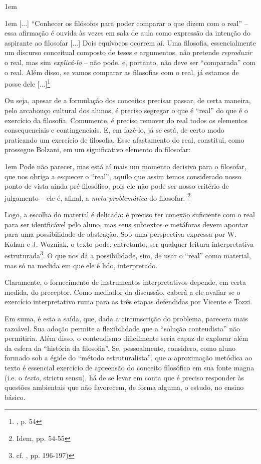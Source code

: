 \documentclass[12pt,a4paper]{article}
\newenvironment{citac}{
	\begin{addmargin}[4cm]{1em} \footnotesize}{\normalfont \end{addmargin}
}
\begin{document}
\begin{citac}
	\begin{citac}
		[...] “Conhecer os filósofos para poder comparar o que 
		dizem com o real” -- essa afirmação é ouvida às vezes 
		em sala de aula como expressão da intenção do aspirante 
		ao filosofar [...] Dois equívocos ocorrem aí. Uma 
		filosofia, essencialmente um discurso conceitual composto 
		de teses e argumentos, não pretende \emph{reproduzir} o 
		real, mas sim \emph{explicá-lo} -- não pode, e, portanto, 
		não deve ser “comparada” com o real. Além disso, se vamos 
		comparar as filosofias com o real, já estamos de posse dele
		[...]\footnote{\cite{bolzani}, p. 54}
	\end{citac}

	Ou seja, apesar de a formulação dos conceitos precisar passar, 
	de certa maneira, pelo arcabouço cultural dos alunos, é preciso 
	segregar o que é “real” do que é o exercício da filosofia. 
	Comumente, é preciso remover do real todos os elementos 
	consequenciais e contingenciais. E, em fazê-lo, já se está, de 
	certo modo praticando um exercício de filosofia. Esse afastamento 
	do real, constitui, como prossegue Bolzani, em um significativo 
	elemento do filosofar: 
	
	\begin{citac}
		Pode não parecer, mas está aí mais um momento decisivo para o 
		filosofar, que nos obriga a esquecer o “real”, aquilo que 
		assim temos considerado nosso ponto de vista ainda 
		pré-filosófico, pois ele não pode ser nosso critério de 
		julgamento -- ele é, afinal, a \emph{meta problemática} do 
		filosofar. \footnote{Idem, pp. 54-55}
	\end{citac}

	Logo, a escolha do material é delicada: é preciso ter conexão 
	suficiente com o real para ser identficável pelo aluno, mas seus 
	subtextos e metáforas devem apontar para uma possibilidade de 
	abstração. Sob uma perspectiva expressa por W. Kohan e J. Wozniak, 
	o texto pode, entretanto, ser qualquer leitura interpretativa 
	estruturada\footnote{cf. \cite{wozkoh}, pp. 196-197)}. O que 
	nos dá a possibilidade, sim, de usar o “real” como material, mas 
	só na medida em que ele é lido, interpretado. 

	Claramente, o fornecimento de instrumentos interpretativos depende, 
	em certa medida, do preceptor. Como mediador da discussão, caberá 
	a ele avaliar se o exercício interpretativo ruma para as três 
	etapas defendidas por Vicente e Tozzi. 

	Em suma, é esta a saída, que, dada a circunscrição do problema, 
	parecera mais razoável. Sua adoção permite a flexibilidade que 
	a “solução conteudista” não permitiria. Além disso, o conteudismo 
	dificilmente seria capaz de explorar além da esfera da “história 
	da filosofia”. Se, pessoalmente, considero, como aluno formado 
	sob a égide do “método estruturalista”, que a aproximação metódica 
	ao texto é essencial exercício de apreensão do conceito filosófico 
	em sua fonte magna (i.e. o \emph{texto}, strictu sensu), há de se 
	levar em conta que é preciso responder às questões ambientais 
	que não favorecem, de forma alguma, o estudo, no ensino básico. 


\end{citac}
\end{document}
